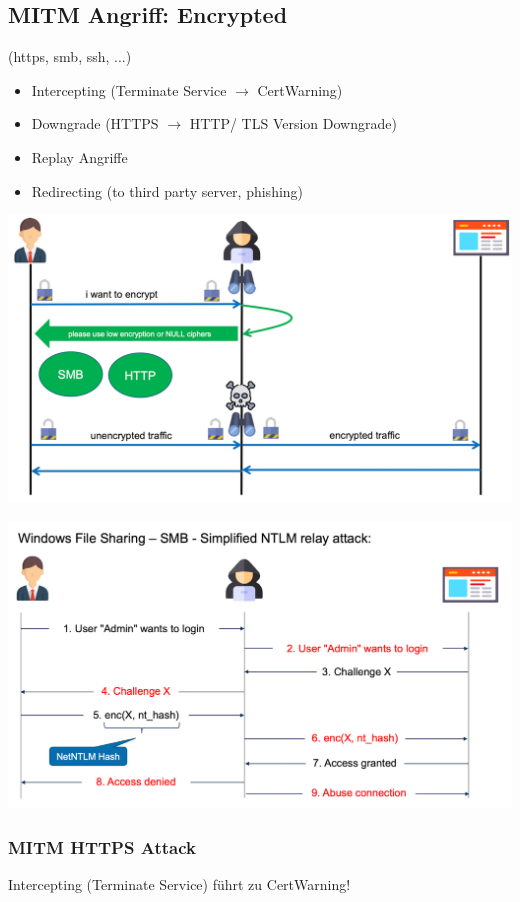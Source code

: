 \subsection{MITM Angriff: Encrypted}
(https, smb, ssh, ...)
\begin{itemize}
    \item Intercepting (Terminate Service $\rightarrow$ CertWarning)
    \item Downgrade (HTTPS $\rightarrow$ HTTP/ TLS Version Downgrade)
    \item Replay Angriffe
    \item Redirecting (to third party server, phishing)
\end{itemize}
\begin{center}
    \vspace{-8pt}
    \includegraphics[width=.8\linewidth]{./img/09-mitm/mitm_enctypt_2}
    \vspace{-8pt}
\end{center}
\begin{center}
    \vspace{-8pt}
    \includegraphics[width=.8\linewidth]{./img/09-mitm/mitm_enctypt_3}
    \vspace{-8pt}
\end{center}

\subsubsection{MITM HTTPS Attack}
Intercepting (Terminate Service) führt zu CertWarning!

